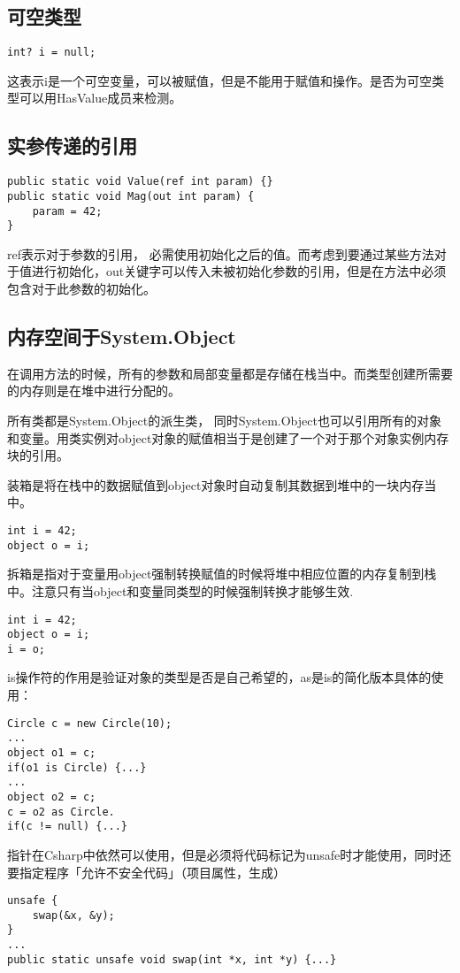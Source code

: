 \documentclass[10pt, a4paper]{article}
\begin{document}
        \subsection{可空类型}
\begin{lstlisting}
int? i = null; 
\end{lstlisting}

        这表示i是一个可空变量，可以被赋值，但是不能用于赋值和操作。是否为可空类型可以用HasValue成员来检测。
        \subsection{实参传递的引用}
\begin{lstlisting}
public static void Value(ref int param) {}
public static void Mag(out int param) {
    param = 42;
}
\end{lstlisting}
        ref表示对于参数的引用， 必需使用初始化之后的值。而考虑到要通过某些方法对于值进行初始化，out关键字可以传入未被初始化参数的引用，但是在方法中必须包含对于此参数的初始化。
        \subsection{内存空间于System.Object}
        在调用方法的时候，所有的参数和局部变量都是存储在栈当中。而类型创建所需要的内存则是在堆中进行分配的。 

        所有类都是System.Object的派生类， 同时System.Object也可以引用所有的对象和变量。用类实例对object对象的赋值相当于是创建了一个对于那个对象实例内存块的引用。

        装箱是将在栈中的数据赋值到object对象时自动复制其数据到堆中的一块内存当中。
\begin{lstlisting}
int i = 42;
object o = i;
\end{lstlisting}

        拆箱是指对于变量用object强制转换赋值的时候将堆中相应位置的内存复制到栈中。注意只有当object和变量同类型的时候强制转换才能够生效.
\begin{lstlisting}
int i = 42; 
object o = i; 
i = o;
\end{lstlisting}

        is操作符的作用是验证对象的类型是否是自己希望的，as是is的简化版本具体的使用：
\begin{lstlisting}
Circle c = new Circle(10); 
...
object o1 = c;
if(o1 is Circle) {...}
...
object o2 = c;
c = o2 as Circle.
if(c != null) {...}
\end{lstlisting}
        
        指针在Csharp中依然可以使用，但是必须将代码标记为unsafe时才能使用，同时还要指定程序「允许不安全代码」（项目属性，生成）
\begin{lstlisting}
unsafe {
    swap(&x, &y); 
}
...
public static unsafe void swap(int *x, int *y) {...}
\end{lstlisting}
\end{document}
